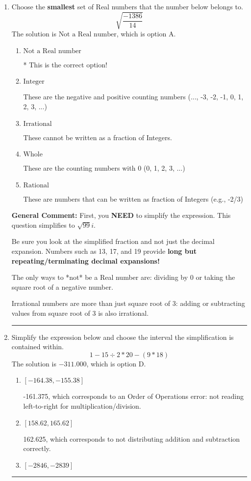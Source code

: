 \documentclass{extbook}[14pt]
\newcommand{\litem}[1]{\item #1

\rule{\textwidth}{0.4pt}}
\begin{document}
\begin{enumerate}\litem{
Choose the \textbf{smallest} set of Real numbers that the number below belongs to.
\[ \sqrt{\frac{-1386}{14}} \]The solution is \( \text{Not a Real number} \), which is option A.\begin{enumerate}[label=\Alph*.]
\item \( \text{Not a Real number} \)

* This is the correct option!
\item \( \text{Integer} \)

These are the negative and positive counting numbers (..., -3, -2, -1, 0, 1, 2, 3, ...)
\item \( \text{Irrational} \)

These cannot be written as a fraction of Integers.
\item \( \text{Whole} \)

These are the counting numbers with 0 (0, 1, 2, 3, ...)
\item \( \text{Rational} \)

These are numbers that can be written as fraction of Integers (e.g., -2/3)
\end{enumerate}

\textbf{General Comment:} First, you \textbf{NEED} to simplify the expression. This question simplifies to $\sqrt{99} i$. 
 
 Be sure you look at the simplified fraction and not just the decimal expansion. Numbers such as 13, 17, and 19 provide \textbf{long but repeating/terminating decimal expansions!} 
 
 The only ways to *not* be a Real number are: dividing by 0 or taking the square root of a negative number. 
 
 Irrational numbers are more than just square root of 3: adding or subtracting values from square root of 3 is also irrational.
}
\litem{
Simplify the expression below and choose the interval the simplification is contained within.
\[ 1 - 15 \div 2 * 20 - (9 * 18) \]The solution is \( -311.000 \), which is option D.\begin{enumerate}[label=\Alph*.]
\item \( [-164.38, -155.38] \)

 -161.375, which corresponds to an Order of Operations error: not reading left-to-right for multiplication/division.
\item \( [158.62, 165.62] \)

 162.625, which corresponds to not distributing addition and subtraction correctly.
\item \( [-2846, -2839] \)


\end{enumerate}}
\end{enumerate}
\end{document}
